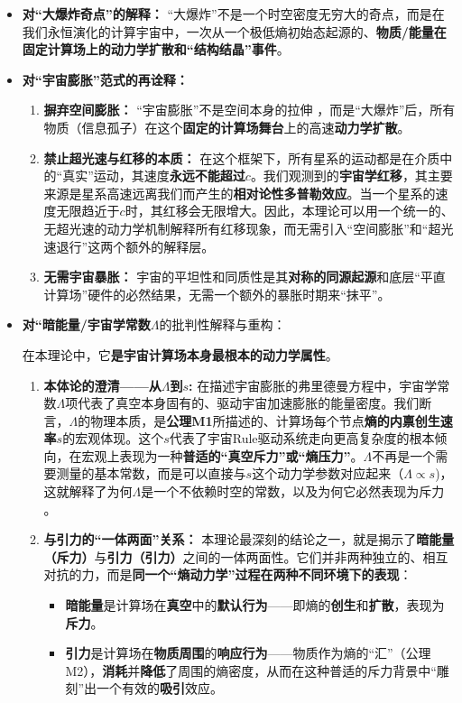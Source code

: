 \documentclass[11pt, a4paper]{article}
\begin{document}
\begin{itemize}
    \item \textbf{对“大爆炸奇点”的解释：}
    “大爆炸”不是一个时空密度无穷大的奇点，而是在我们永恒演化的计算宇宙中，一次从一个极低熵初始态起源的、\textbf{物质/能量在固定计算场上的动力学扩散和“结构结晶”事件}。

    \item \textbf{对“宇宙膨胀”范式的再诠释：}
    \begin{enumerate}
        \item \textbf{摒弃空间膨胀：} “宇宙膨胀”不是空间本身的拉伸 \cite{Guth1981}，而是“大爆炸”后，所有物质（信息孤子）在这个\textbf{固定的计算场舞台}上的高速\textbf{动力学扩散}。
        \item \textbf{禁止超光速与红移的本质：} 在这个框架下，所有星系的运动都是在介质中的“真实”运动，其速度\textbf{永远不能超过$c$}。我们观测到的\textbf{宇宙学红移}，其主要来源是星系高速远离我们而产生的\textbf{相对论性多普勒效应}。当一个星系的速度无限趋近于$c$时，其红移会无限增大。因此，本理论可以用一个统一的、无超光速的动力学机制解释所有红移现象，而无需引入“空间膨胀”和“超光速退行”这两个额外的解释层。
        \item \textbf{无需宇宙暴胀：} 宇宙的平坦性和同质性是其\textbf{对称的同源起源}和底层“平直计算场”硬件的必然结果，无需一个额外的暴胀时期来“抹平”。
    \end{enumerate}

    \item \textbf{对“暗能量/宇宙学常数$\Lambda$}的批判性解释与重构：

    在本理论中，它\textbf{是宇宙计算场本身最根本的动力学属性}。
    \begin{enumerate}
        \item \textbf{本体论的澄清——从$\Lambda$到$s$: } 在描述宇宙膨胀的弗里德曼方程中，宇宙学常数$\Lambda$项代表了真空本身固有的、驱动宇宙加速膨胀的能量密度。我们断言，$\Lambda$的物理本质，是\textbf{公理M1}所描述的、计算场每个节点\textbf{熵的内禀创生速率$s$}的宏观体现。这个$s$代表了宇宙Rule驱动系统走向更高复杂度的根本倾向，在宏观上表现为一种\textbf{普适的“真空斥力”或“熵压力”}。$\Lambda$不再是一个需要测量的基本常数，而是可以直接与$s$这个动力学参数对应起来（$\Lambda \propto s$)，这就解释了为何$\Lambda$是一个不依赖时空的常数，以及为何它必然表现为斥力 \cite{Planck2020}。

        \item \textbf{与引力的“一体两面”关系：} 本理论最深刻的结论之一，就是揭示了\textbf{暗能量（斥力）}与\textbf{引力（引力）}之间的一体两面性。它们并非两种独立的、相互对抗的力，而是\textbf{同一个“熵动力学”过程在两种不同环境下的表现}：
        \begin{itemize}
            \item \textbf{暗能量}是计算场在\textbf{真空}中的\textbf{默认行为}——即熵的\textbf{创生}和\textbf{扩散}，表现为\textbf{斥力}。
            \item \textbf{引力}是计算场在\textbf{物质周围}的\textbf{响应行为}——物质作为熵的“汇”（公理M2），\textbf{消耗}并\textbf{降低}了周围的熵密度，从而在这种普适的斥力背景中“雕刻”出一个有效的\textbf{吸引}效应。
        \end{itemize}


\end{enumerate}
\end{itemize}
\end{document}
